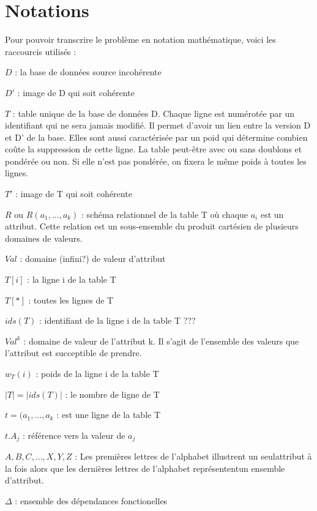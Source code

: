 \documentclass[12pt, a4paper, oneside, titlepage]{book}%
\begin{document}
\section{Notations}\label{SECnotations}
Pour pouvoir transcrire le problème en notation mathématique, voici les raccourcis utilisés : 
\begin{description}
\item{$D$ : } la base de données source incohérente %
\item{$D'$ : } image de D qui soit cohérente
\item{$T$ : } table unique de la base de données D. Chaque ligne est numérotée par un identifiant qui ne sera jamais modifié. Il permet d'avoir un lien entre la version D et D' de la base. Elles sont aussi caractérisée par un poid qui détermine combien coûte la suppression de cette ligne. La table peut-être avec ou sans doublons et pondérée ou non. Si elle n'est pas pondérée, on fixera le même poids à toutes les lignes.
\item{$T'$ : } image de T qui soit cohérente
\item{$R$ ou $R(a_{1}, ... , a_{k})$ : } schéma relationnel de la table T où chaque $a_i$ est un attribut. Cette relation est un sous-ensemble du produit cartésien de plusieurs domaines de valeurs.
\item{$Val$ : } domaine (infini?) de valeur d'attribut
\item{$T[i]$ : } la ligne i de la table T
\item{$T[*]$ : } toutes les lignes de T
\item{$ids(T)$ : } identifiant de la ligne i de la table T ???
\item{$Val^k$ : } domaine de valeur de l'attribut k. Il s'agit de l'ensemble des valeurs que l'attribut est succeptible de prendre.
\item{$w_T(i)$ : } poids de la ligne i de la table T
\item{$|T| = |ids(T)|$ : } le nombre de ligne de T
\item{$t = (a_1, ..., a_k$ : } est une ligne de la table T
\item{$t.A_j$ : } référence vers la valeur de $a_j$
\item{$A, B,C,..., X, Y, Z$ : } Les premières lettres de l'alphabet illustrent un seulattribut à la fois alors que les dernières lettres de l'alphabet représententun ensemble d'attribut.
\item{$\Delta$ : } ensemble des dépendances fonctionelles

\end{description}
\end{document}

